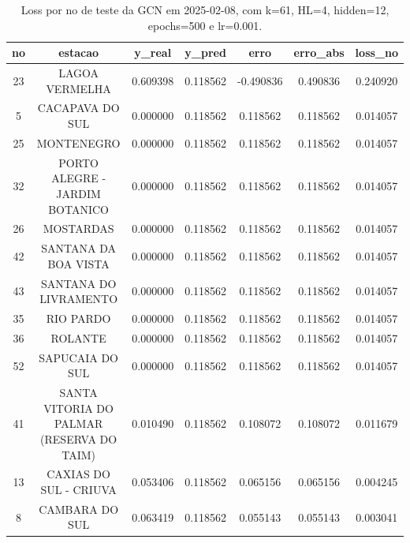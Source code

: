 \begin{table}[h]
\centering
\caption{Loss por no de teste da GCN em 2025-02-08, com k=61, HL=4, hidden=12, epochs=500 e lr=0.001.}
\label{tab:gcn_loss_k61_hl4_h12_e500_d20250208}
\begin{tabular}{ccccccc}
\toprule
no & estacao & y\_real & y\_pred & erro & erro\_abs & loss\_no \\
\midrule
23 & LAGOA VERMELHA & 0.609398 & 0.118562 & -0.490836 & 0.490836 & 0.240920 \\
5 & CACAPAVA DO SUL & 0.000000 & 0.118562 & 0.118562 & 0.118562 & 0.014057 \\
25 & MONTENEGRO & 0.000000 & 0.118562 & 0.118562 & 0.118562 & 0.014057 \\
32 & PORTO ALEGRE - JARDIM BOTANICO & 0.000000 & 0.118562 & 0.118562 & 0.118562 & 0.014057 \\
26 & MOSTARDAS & 0.000000 & 0.118562 & 0.118562 & 0.118562 & 0.014057 \\
42 & SANTANA DA BOA VISTA & 0.000000 & 0.118562 & 0.118562 & 0.118562 & 0.014057 \\
43 & SANTANA DO LIVRAMENTO & 0.000000 & 0.118562 & 0.118562 & 0.118562 & 0.014057 \\
35 & RIO PARDO & 0.000000 & 0.118562 & 0.118562 & 0.118562 & 0.014057 \\
36 & ROLANTE & 0.000000 & 0.118562 & 0.118562 & 0.118562 & 0.014057 \\
52 & SAPUCAIA DO SUL & 0.000000 & 0.118562 & 0.118562 & 0.118562 & 0.014057 \\
41 & SANTA VITORIA DO PALMAR (RESERVA DO TAIM) & 0.010490 & 0.118562 & 0.108072 & 0.108072 & 0.011679 \\
13 & CAXIAS DO SUL - CRIUVA & 0.053406 & 0.118562 & 0.065156 & 0.065156 & 0.004245 \\
8 & CAMBARA DO SUL & 0.063419 & 0.118562 & 0.055143 & 0.055143 & 0.003041 \\
\bottomrule
\end{tabular}
\end{table}
